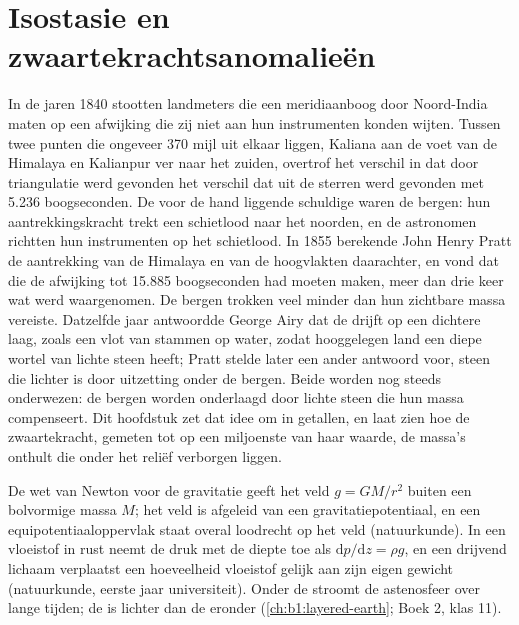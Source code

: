 \chapter{Isostasie en zwaartekrachtsanomalieën}\label{ch:b1:isostasy-gravity}

In de jaren 1840 stootten landmeters die een meridiaanboog door Noord-India maten op een afwijking die zij niet aan hun instrumenten konden wijten. Tussen twee punten die ongeveer 370 mijl uit elkaar liggen, Kaliana aan de voet van de Himalaya en Kalianpur ver naar het zuiden, overtrof het verschil in  dat door triangulatie werd gevonden het verschil dat uit de sterren werd gevonden met 5.236 boogseconden. De voor de hand liggende schuldige waren de bergen: hun aantrekkingskracht trekt een schietlood naar het noorden, en de astronomen richtten hun instrumenten op het schietlood. In 1855 berekende John Henry Pratt de aantrekking van de Himalaya en van de hoogvlakten daarachter, en vond dat die de afwijking tot 15.885 boogseconden had moeten maken, meer dan drie keer wat werd waargenomen. De bergen trokken veel minder dan hun zichtbare massa vereiste. Datzelfde jaar antwoordde George Airy dat de  drijft op een dichtere laag, zoals een vlot van stammen op water, zodat hooggelegen land een diepe wortel van lichte steen heeft; Pratt stelde later een ander antwoord voor, steen die lichter is door uitzetting onder de bergen. Beide worden nog steeds onderwezen: de bergen worden onderlaagd door lichte steen die hun massa compenseert. Dit hoofdstuk zet dat idee om in getallen, en laat zien hoe de zwaartekracht, gemeten tot op een miljoenste van haar waarde, de massa's onthult die onder het reliëf verborgen liggen.

\begin{recall}
De wet van Newton voor de gravitatie geeft het veld $g = GM/r^2$ buiten een bolvormige massa $M$; het veld is afgeleid van een gravitatiepotentiaal, en een equipotentiaaloppervlak staat overal loodrecht op het veld (natuurkunde). In een vloeistof in rust neemt de druk met de diepte toe als $\mathrm dp/\mathrm dz = \rho g$, en een drijvend lichaam verplaatst een hoeveelheid vloeistof gelijk aan zijn eigen gewicht (natuurkunde, eerste jaar universiteit). Onder de  stroomt de astenosfeer over lange tijden; de  is lichter dan de  eronder (\cref{ch:b1:layered-earth}; Boek 2, klas 11).
\end{recall}

